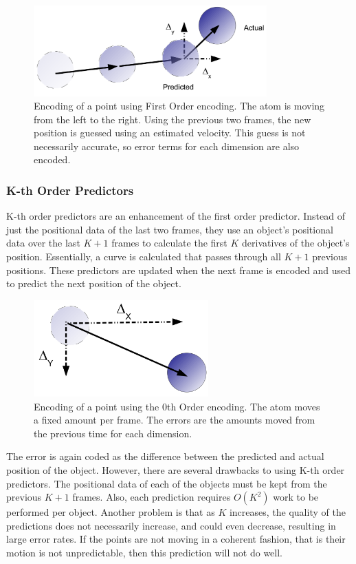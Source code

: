 \documentclass[a4paper,11pt]{report}
\begin{document}
\begin{figure}[h]
 \center
 \includegraphics[width=0.8\textwidth]{resources/FirstOrderEncoding.png}
\caption{Encoding of a point using First Order encoding. The atom is moving from the left to the right. Using the previous two frames, the new position is guessed using an estimated velocity. This guess is not necessarily accurate, so error terms for each dimension are also encoded.}
\label{linearencoding}
\end{figure}

\subsubsection{K-th Order Predictors}

K-th order predictors are an enhancement of the first order predictor. Instead of just the positional data of the last two frames, they use an object's positional data over the last $K+1$ frames to calculate the first $K$ derivatives of the object's position. Essentially, a curve is calculated that passes through all $K+1$ previous positions. These predictors are updated when the next frame is encoded and used to predict the next position of the object.

\begin{figure}[h]
 \center
 \includegraphics[width=0.6\textwidth]{resources/DeltaEncoding.png}
\caption{Encoding of a point using the 0th Order encoding. The atom moves a fixed amount per frame. The errors are the amounts moved from the previous time for each dimension.}
\label{deltaencoding}
\end{figure}

The error is again coded as the difference between the predicted and actual position of the object. However, there are several drawbacks to using K-th order predictors. The positional data of each of the objects must be kept from the previous $K+1$ frames. Also, each prediction requires $O(K^2)$ work to be performed per object. Another problem is that as $K$ increases, the quality of the predictions does not necessarily increase, and could even decrease, resulting in large error rates. If the points are not moving in a coherent fashion, that is their motion is not unpredictable, then this prediction will not do well.
\end{document}
